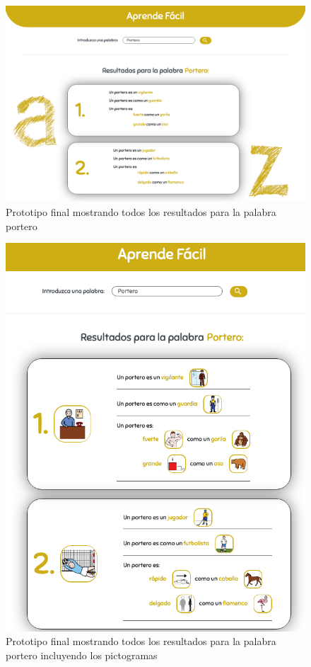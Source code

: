 \begin{figure}[!t]
	\includegraphics[width=.8\textwidth]{Imagenes/Bitmap/Mockups/mockup3_irene_final.png}
	\centering
	\caption{Prototipo final mostrando todos los resultados para la palabra portero}
	\label{fig:mockup3irene_vFinal}
\end{figure}
\begin{figure}[!t]
	\includegraphics[width=.8\textwidth]{Imagenes/Bitmap/Mockups/mockup4_irene_final.png}
	\centering
	\caption{Prototipo final mostrando todos los resultados para la palabra portero incluyendo los pictogramas}
	\label{fig:mockup4irene_vFinal}
\end{figure}

